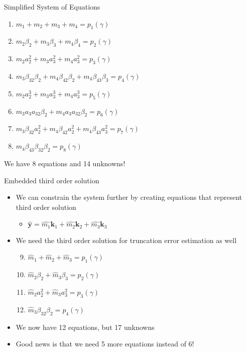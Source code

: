 \documentclass[serif]{beamer}
\begin{document}
\begin{frame}{Simplified System of Equations}
  \begin{enumerate}
   \item<1-> $m_1 + m_2 + m_3 + m_4 = p_1\left(\gamma\right)$
   \vfill
   \item<1-> $m_2\beta_2 + m_3\beta_3 + m_4\beta_4 = p_2\left(\gamma\right)$
   \vfill
   \item<1-> $m_2a^2_2 + m_3a^2_3 + m_4a^2_3 = p_3\left(\gamma\right)$
   \vfill
   \item<1-> $m_3\beta_{32}\beta_2 + m_4\beta_{42}\beta_2 + m_4\beta_{43}\beta_3 = p_4\left(\gamma\right)$
   \vfill
   \item<1-> $m_2a^3_2 + m_3a^3_3 + m_4a^3_3 = p_5\left(\gamma\right)$
   \vfill
   \item<1-> $m_3a_3a_{32}\beta_2 + m_4a_3a_{32}\beta_2 = p_6\left(\gamma\right)$
   \vfill
   \item<1-> $m_3\beta_{32}a_2^2 + m_4\beta_{42}a_2^2 + m_4\beta_{43}a_3^2 = p_7\left(\gamma\right)$
   \vfill
   \item<1-> $m_4\beta_{43}\beta_{32}\beta_2 = p_8\left(\gamma\right)$
  \end{enumerate}
  \vfill
  \begin{center}
    \alert{We have 8 equations and 14 unknowns!}
  \end{center}
\end{frame}

\begin{frame}{Embedded third order solution}
  \begin{itemize}
    \item We can constrain the system further by creating equations that represent third order solution
    \begin{itemize}
      \item $\hat{\mathbf{y}} = \hat{m_1}\mathbf{k}_1 + \hat{m_2}\mathbf{k}_2 + \hat{m_3}\mathbf{k}_3$
    \end{itemize}
    \vfill
    \item We need the third order solution for truncation error estimation as well
    \vfill
    \begin{enumerate}
     \setcounter{enumi}{8}
     \item<1-> $\hat{m}_1 + \hat{m}_2 + \hat{m}_3 = p_1\left(\gamma\right)$ \vfill
     \item<1-> $\hat{m}_2\beta_2 + \hat{m}_3\beta_3 = p_2\left(\gamma\right)$\vfill
     \item<1-> $\hat{m}_2a^2_2 + \hat{m}_3a^2_3 = p_3\left(\gamma\right)$ \vfill
     \item<1-> $\hat{m}_3\beta_{32}\beta_2 = p_4\left(\gamma\right)$ \vfill
    \end{enumerate}
    \vfill
    \item<1-> We now have 12 equations, but 17 unknowns
    \vfill
    \item<1-> Good news is that we need 5 more equations instead of 6!
  \end{itemize}
\end{frame}
\end{document}
